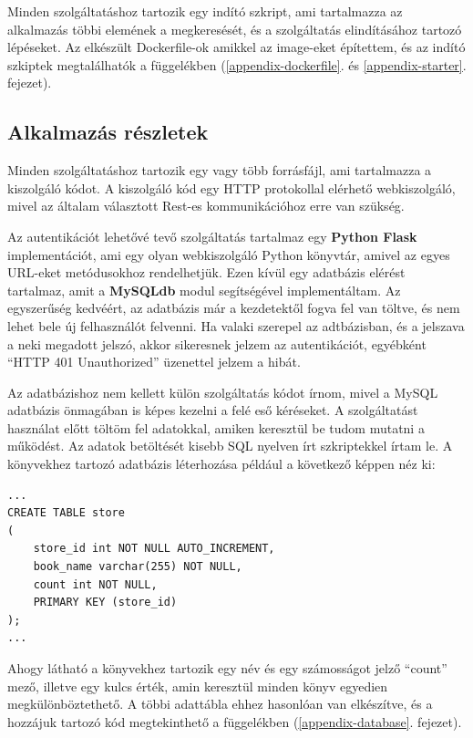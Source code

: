 \documentclass[11pt,magyar,a4paper,twoside,]{report}
\begin{document}
Minden szolgáltatáshoz tartozik egy indító szkript, ami tartalmazza az
alkalmazás többi elemének a megkeresését, és a szolgáltatás
elindításához tartozó lépéseket. Az elkészült Dockerfile-ok amikkel az
image-eket építettem, és az indító szkiptek megtalálhatók a függelékben
(\ref{appendix-dockerfile}. és \ref{appendix-starter}. fejezet).

\subsection{Alkalmazás részletek}\label{alkalmazuxe1s-ruxe9szletek}

Minden szolgáltatáshoz tartozik egy vagy több forrásfájl, ami
tartalmazza a kiszolgáló kódot. A kiszolgáló kód egy HTTP protokollal
elérhető webkiszolgáló, mivel az általam választott Rest-es
kommunikációhoz erre van szükség.

Az autentikációt lehetővé tevő szolgáltatás tartalmaz egy \textbf{Python
Flask} implementációt, ami egy olyan webkiszolgáló Python könyvtár,
amivel az egyes URL-eket metódusokhoz rendelhetjük. Ezen kívül egy
adatbázis elérést tartalmaz, amit a \textbf{MySQLdb} modul segítségével
implementáltam. Az egyszerűség kedvéért, az adatbázis már a kezdetektől
fogva fel van töltve, és nem lehet bele új felhasználót felvenni. Ha
valaki szerepel az adtbázisban, és a jelszava a neki megadott jelszó,
akkor sikeresnek jelzem az autentikációt, egyébként ``HTTP 401
Unauthorized'' üzenettel jelzem a hibát.

Az adatbázishoz nem kellett külön szolgáltatás kódot írnom, mivel a
MySQL adatbázis önmagában is képes kezelni a felé eső kéréseket. A
szolgáltatást használat előtt töltöm fel adatokkal, amiken keresztül be
tudom mutatni a működést. Az adatok betöltését kisebb SQL nyelven írt
szkriptekkel írtam le. A könyvekhez tartozó adatbázis léterhozása
például a következő képpen néz ki:

\begin{verbatim}
...
CREATE TABLE store
(
    store_id int NOT NULL AUTO_INCREMENT,
    book_name varchar(255) NOT NULL,
    count int NOT NULL,
    PRIMARY KEY (store_id)
);
...
\end{verbatim}

Ahogy látható a könyvekhez tartozik egy név és egy számosságot jelző
``count'' mező, illetve egy kulcs érték, amin keresztül minden könyv
egyedien megkülönböztethető. A többi adattábla ehhez hasonlóan van
elkészítve, és a hozzájuk tartozó kód megtekinthető a függelékben
(\ref{appendix-database}. fejezet).
\end{document}
